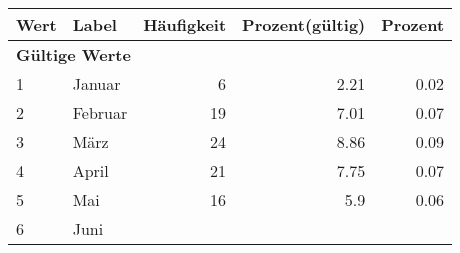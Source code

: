      \begin{longtable}{lXrrr}
     \toprule
     \textbf{Wert} & \textbf{Label} & \textbf{Häufigkeit} & \textbf{Prozent(gültig)} & \textbf{Prozent} \\
     \endhead
     \midrule
     \multicolumn{5}{l}{\textbf{Gültige Werte}}\\

     1 &
     \multicolumn{1}{X}{ Januar   } &


       \num{6} &
       \num[round-mode=places,round-precision=2]{2,21} &
         \num[round-mode=places,round-precision=2]{0,02} \\

     2 &
     \multicolumn{1}{X}{ Februar   } &


       \num{19} &
       \num[round-mode=places,round-precision=2]{7,01} &
         \num[round-mode=places,round-precision=2]{0,07} \\

     3 &
     \multicolumn{1}{X}{ März   } &


       \num{24} &
       \num[round-mode=places,round-precision=2]{8,86} &
         \num[round-mode=places,round-precision=2]{0,09} \\

     4 &
     \multicolumn{1}{X}{ April   } &


       \num{21} &
       \num[round-mode=places,round-precision=2]{7,75} &
         \num[round-mode=places,round-precision=2]{0,07} \\

     5 &
     \multicolumn{1}{X}{ Mai   } &


       \num{16} &
       \num[round-mode=places,round-precision=2]{5,9} &
         \num[round-mode=places,round-precision=2]{0,06} \\

     6 &
     \multicolumn{1}{X}{ Juni   } &



\end{longtable}
